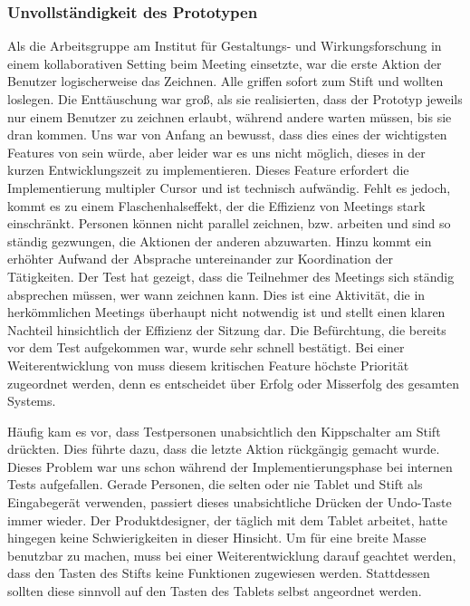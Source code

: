 \subsubsection{Unvollständigkeit des Prototypen}
Als die Arbeitsgruppe am Institut für Gestaltungs- und Wirkungsforschung \scribbler in einem kollaborativen Setting beim Meeting einsetzte, war die erste Aktion der Benutzer logischerweise das Zeichnen. Alle griffen sofort zum Stift und wollten loslegen. Die Enttäuschung war groß, als sie realisierten, dass der Prototyp jeweils nur einem Benutzer zu zeichnen erlaubt, während andere warten müssen, bis sie dran kommen. Uns war von Anfang an bewusst, dass dies eines der wichtigsten Features von \scribbler sein würde, aber leider war es uns nicht möglich, dieses in der kurzen Entwicklungszeit zu implementieren. Dieses Feature erfordert die Implementierung multipler Cursor und ist technisch aufwändig. Fehlt es jedoch, kommt es zu einem Flaschenhalseffekt, der die Effizienz von Meetings stark einschränkt. Personen können nicht parallel zeichnen, bzw. arbeiten und sind so ständig gezwungen, die Aktionen der anderen abzuwarten. Hinzu kommt ein erhöhter Aufwand der Absprache untereinander zur Koordination der Tätigkeiten. Der Test hat gezeigt, dass die Teilnehmer des Meetings sich ständig absprechen müssen, wer wann zeichnen kann. Dies ist eine Aktivität, die in herkömmlichen Meetings überhaupt nicht notwendig ist und stellt einen klaren Nachteil hinsichtlich der Effizienz der Sitzung dar. Die Befürchtung, die bereits vor dem Test aufgekommen war, wurde sehr schnell bestätigt. Bei einer Weiterentwicklung von \scribbler muss diesem kritischen Feature höchste Priorität zugeordnet werden, denn es entscheidet über Erfolg oder Misserfolg des gesamten Systems.

\medskip Häufig kam es vor, dass Testpersonen unabsichtlich den Kippschalter am Stift drückten. Dies führte dazu, dass die letzte Aktion rückgängig gemacht wurde. Dieses Problem war uns schon während der Implementierungsphase bei internen Tests aufgefallen. Gerade Personen, die selten oder nie Tablet und Stift als Eingabegerät verwenden, passiert dieses unabsichtliche Drücken der Undo-Taste immer wieder. Der Produktdesigner, der täglich mit dem Tablet arbeitet, hatte hingegen keine Schwierigkeiten in dieser Hinsicht. Um \scribbler für eine breite Masse benutzbar zu machen, muss bei einer Weiterentwicklung darauf geachtet werden, dass den Tasten des Stifts keine Funktionen zugewiesen werden. Stattdessen sollten diese sinnvoll auf den Tasten des Tablets selbst angeordnet werden.

